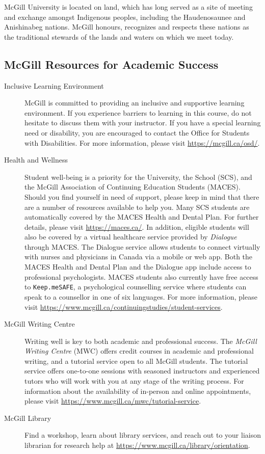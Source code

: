 \documentclass{article}
\begin{document}
McGill University is located on land, which has long served as a site
of meeting and exchange amongst Indigenous peoples, including the
Haudenosaunee and Anishinabeg nations. McGill honours, recognizes and
respects these nations as the traditional stewards of the lands and
waters on which we meet today.

\subsection{McGill Resources for Academic Success}

\begin{description}
\item[Inclusive Learning Environment]{McGill is committed to providing
  an inclusive and supportive learning environment. If you experience
  barriers to learning in this course, do not hesitate to discuss them
  with your instructor. If you have a special learning need or
  disability, you are encouraged to contact the Office for Students
  with Disabilities. For more information, please visit
  \url{https://mcgill.ca/osd/}.}
\item[Health and Wellness]{Student well-being is a priority for the
  University, the School (SCS), and the McGill Association of
  Continuing Education Students (MACES). Should you find yourself in
  need of support, please keep in mind that there are a number of
  resources available to help you. Many SCS students are automatically
  covered by the MACES Health and Dental Plan. For further details,
  please visit \url{https://maces.ca/}. In addition, eligible students
  will also be covered by a virtual healthcare service provided by
  {\em Dialogue} through MACES. The Dialogue service allows students
  to connect virtually with nurses and physicians in Canada via a
  mobile or web app. Both the MACES Health and Dental Plan and the
  Dialogue app include access to professional psychologists. MACES
  students also currently have free access to \texttt{Keep.meSAFE}, a
  psychological counselling service where students can speak to a
  counsellor in one of six languages. For more information, please
  visit
  \url{https://www.mcgill.ca/continuingstudies/student-services}.}
\item[McGill Writing Centre]{Writing well is key to both academic and
  professional success. The {\em McGill Writing Centre} (MWC) offers
  credit courses in academic and professional writing, and a tutorial
  service open to all McGill students. The tutorial service offers
  one-to-one sessions with seasoned instructors and experienced tutors
  who will work with you at any stage of the writing process.  For
  information about the availability of in-person and online
  appointments, please visit
  \url{https://www.mcgill.ca/mwc/tutorial-service}.}
\item[McGill Library]{Find a workshop, learn about library services,
  and reach out to your liaison librarian for research help at
  \url{https://www.mcgill.ca/library/orientation}.}
\end{description}
\end{document}
